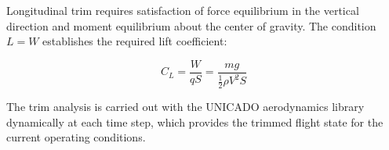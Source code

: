Longitudinal trim requires satisfaction of force equilibrium in the vertical direction and moment equilibrium about the center of gravity. The condition $L = W$ establishes the required lift coefficient:

\begin{equation}
C_L = \frac{W}{qS} = \frac{mg}{\frac{1}{2}\rho V^2 S}
\end{equation}

The trim analysis is carried out with the UNICADO aerodynamics library dynamically at each time step, which provides the trimmed flight state for the current operating conditions.

